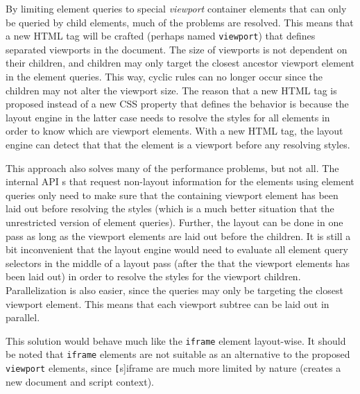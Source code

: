 \documentclass[a4paper,11pt]{kth-mag}
\newcommand{\code}[1]{\texttt{#1}}
\newcommand\abbr[2][]{\uppercase{#2}\ifthenelse{\equal{#1}{}}%
                     {}{#1}}
\begin{document}
          By limiting element queries to special \emph{viewport} container elements that can only be queried by child elements, much of the problems are resolved.
          This means that a new \abbr{html} tag will be crafted (perhaps named \code{viewport}) that defines separated viewports in the document.
          The size of viewports is not dependent on their children, and children may only target the closest ancestor viewport element in the element queries.
          This way, cyclic rules can no longer occur since the children may not alter the viewport size.
          The reason that a new \abbr{html} tag is proposed instead of a new \abbr{css} property that defines the behavior is because the layout engine in the latter case needs to resolve the styles for all elements in order to know which are viewport elements.
          With a new \abbr{html} tag, the layout engine can detect that that the element is a viewport before any resolving styles.

          This approach also solves many of the performance problems, but not all.
          The internal \abbr[s]{api} that request non-layout information for the elements using element queries only need to make sure that the containing viewport element has been laid out before resolving the styles (which is a much better situation that the unrestricted version of element queries).
          Further, the layout can be done in one pass as long as the viewport elements are laid out before the children.
          It is still a bit inconvenient that the layout engine would need to evaluate all element query selectors in the middle of a layout pass (after the that the viewport elements has been laid out) in order to resolve the styles for the viewport children.
          Parallelization is also easier, since the queries may only be targeting the closest viewport element.
          This means that each viewport subtree can be laid out in parallel.

          This solution would behave much like the \code{iframe} element layout-wise.
          It should be noted that \code{iframe} elements are not suitable as an alternative to the proposed \code{viewport} elements, since \code[s]{iframe} are much more limited by nature (creates a new document and script context).
\end{document}
